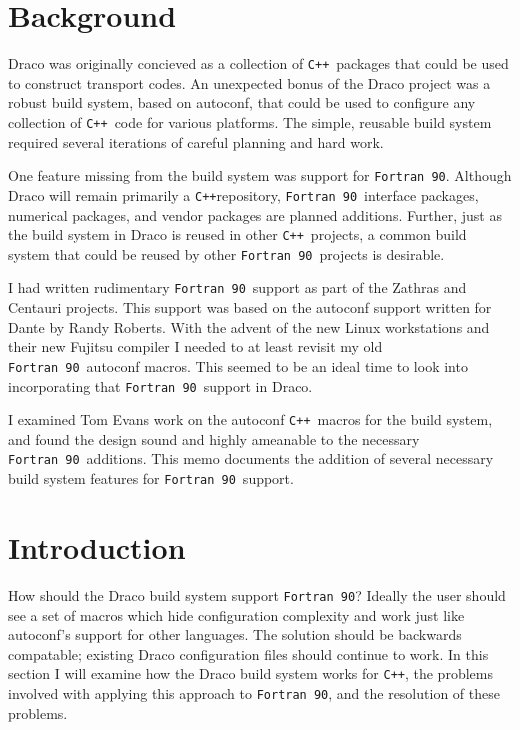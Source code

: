 \documentclass[11pt]{nmemo}
\newcommand{\fninety}{\texttt{Fortran~90}}
\newcommand{\cpp}{\texttt{C++}}
\begin{document}
\section{Background}

Draco was originally concieved as a collection of \cpp\ packages that
could be used to construct transport codes.  An unexpected bonus of
the Draco project was a robust build system, based on autoconf, that
could be used to configure any collection of \cpp\ code for various
platforms.  The simple, reusable build system required several
iterations of careful planning and hard work.

One feature missing from the build system was support for \fninety.
Although Draco will remain primarily a \cpp repository, \fninety\
interface packages, numerical packages, and vendor packages are
planned additions.  Further, just as the build system in Draco is
reused in other \cpp\ projects, a common build system that could be
reused by other \fninety\ projects is desirable.

I had written rudimentary \fninety\ support as part of the Zathras and
Centauri projects.  This support was based on the autoconf support
written for Dante by Randy Roberts.  With the advent of the new Linux
workstations and their new Fujitsu compiler I needed to at least
revisit my old \fninety\ autoconf macros.  This seemed to be an ideal
time to look into incorporating that \fninety\ support in Draco.

I examined Tom Evans work on the autoconf \cpp\ macros for the build
system, and found the design sound and highly ameanable to the
necessary \fninety\ additions.  This memo documents the addition of
several necessary build system features for \fninety\ support.

\newpage

\section{Introduction}

How should the Draco build system support \fninety?  Ideally the user
should see a set of macros which hide configuration complexity and work
just like autoconf's support for other languages.  The solution should
be backwards compatable; existing Draco configuration files should
continue to work.  In this section I will examine how the Draco build
system works for \cpp, the problems involved with applying this
approach to \fninety, and the resolution of these problems.
\end{document}
